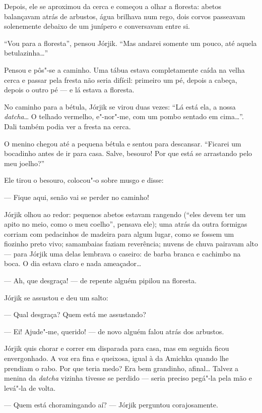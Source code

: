Depois, ele se aproximou da cerca e começou a olhar a floresta: abetos
balançavam atrás de arbustos, água brilhava num rego, dois corvos
passeavam solenemente debaixo de um junípero e conversavam entre si.

``Vou para a floresta'', pensou Jórjik. ``Mas andarei somente um pouco,
até aquela betulazinha\ldots{}''

Pensou e pôs"-se a caminho. Uma tábua estava completamente caída na velha
cerca e passar pela fresta não seria difícil: primeiro um pé, depois a
cabeça, depois o outro pé --- e lá estava a floresta.

No caminho para a bétula, Jórjik se virou duas vezes: ``Lá está ela, a
nossa \emph{datcha}\ldots{} O telhado vermelho, e"-nor"-me, com um pombo
sentado em cima\ldots{}''. Dali também podia ver a fresta na cerca.

O menino chegou até a pequena bétula e sentou para descansar. ``Ficarei
um bocadinho antes de ir para casa. Salve, besouro! Por que está se
arrastando pelo meu joelho?''

Ele tirou o besouro, colocou"-o sobre musgo e disse:

--- Fique aqui, senão vai se perder no caminho!

Jórjik olhou ao redor: pequenos abetos estavam rangendo (``eles devem
ter um apito no meio, como o meu coelho'', pensava ele); uma atrás da
outra formigas corriam com pedacinhos de madeira para algum lugar, como
se fossem um fiozinho preto vivo; samambaias faziam reverência; nuvens
de chuva pairavam alto --- para Jórjik uma delas lembrava o caseiro: de
barba branca e cachimbo na boca. O dia estava claro e nada ameaçador\ldots{}

--- Ah, que desgraça! --- de repente alguém pipilou na floresta.

Jórjik se assustou e deu um salto:

--- Qual desgraça? Quem está me assustando?

--- Ei! Ajude"-me, querido! --- de novo alguém falou atrás dos arbustos.

Jórjik quis chorar e correr em disparada para casa, mas em seguida ficou
envergonhado. A voz era fina e queixosa, igual à da Amichka quando lhe
prendiam o rabo. Por que teria medo? Era bem grandinho, afinal\ldots{} Talvez
a menina da \emph{datcha} vizinha tivesse se perdido --- seria preciso
pegá"-la pela mão e levá"-la de volta.

--- Quem está choramingando aí? --- Jórjik perguntou corajosamente.

